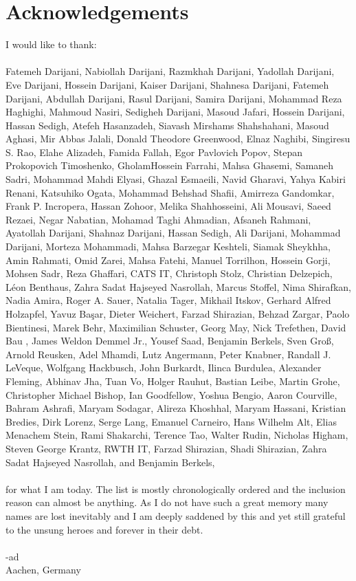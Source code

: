\chapter*{Acknowledgements}


I would like to thank:\\\\
\noindent Fatemeh Darijani, Nabiollah Darijani, Razmkhah Darijani, Yadollah Darijani, Eve Darijani, Hossein Darijani, 
Kaiser Darijani, Shahnesa Darijani, Fatemeh Darijani, Abdullah Darijani, Rasul Darijani, Samira Darijani, 
Mohammad Reza Haghighi, Mahmoud Nasiri, Sedigheh Darijani, Masoud Jafari, Hossein Darijani, Hassan Sedigh, 
Atefeh Hasanzadeh, Siavash Mirshams Shahshahani, Masoud Aghasi, Mir Abbas Jalali, Donald Theodore Greenwood, Elnaz Naghibi, 
Singiresu S. Rao, Elahe Alizadeh, Famida Fallah, Egor Pavlovich Popov, Stepan Prokopovich Timoshenko, GholamHossein Farrahi, 
Mahsa Ghasemi, Samaneh Sadri, Mohammad Mahdi Elyasi, Ghazal Esmaeili, Navid Gharavi, Yahya Kabiri Renani, Katsuhiko Ogata, 
Mohammad Behshad Shafii, Amirreza Gandomkar, Frank P. Incropera, Hassan Zohoor, Melika Shahhosseini, Ali Mousavi, 
Saeed Rezaei, Negar Nabatian, Mohamad Taghi Ahmadian, Afsaneh Rahmani, Ayatollah Darijani, Shahnaz Darijani, 
Hassan Sedigh, Ali Darijani, Mohammad Darijani, Morteza Mohammadi, Mahsa Barzegar Keshteli, Siamak Sheykhha, Amin Rahmati, 
Omid Zarei, Mahsa Fatehi, Manuel Torrilhon, Hossein Gorji, Mohsen Sadr, Reza Ghaffari, CATS IT, Christoph Stolz, 
Christian Delzepich, Léon Benthaus, Zahra Sadat Hajseyed Nasrollah, Marcus Stoffel, Nima Shirafkan, Nadia Amira, 
Roger A. Sauer, Natalia Tager, Mikhail Itskov, Gerhard Alfred Holzapfel, Yavuz Ba\c{s}ar, Dieter Weichert, 
Farzad Shirazian, Behzad Zargar, Paolo Bientinesi, Marek Behr, Maximilian Schuster, Georg May, Nick Trefethen, 
David Bau {\MakeUppercase{}}, James Weldon Demmel Jr., Yousef Saad, Benjamin Berkels, Sven Gro{\ss}, 
Arnold Reusken, Adel Mhamdi, Lutz Angermann, Peter Knabner, Randall J. LeVeque, Wolfgang Hackbusch, John Burkardt, 
Ilinca Burdulea, Alexander Fleming, Abhinav Jha,  Tuan Vo, Holger Rauhut, Bastian Leibe, Martin Grohe, 
Christopher Michael Bishop, Ian Goodfellow, Yoshua Bengio, Aaron Courville, Bahram Ashrafi, Maryam Sodagar, 
Alireza Khoshhal, Maryam Hassani, Kristian Bredies, Dirk Lorenz, Serge Lang, Emanuel Carneiro, Hans Wilhelm Alt, 
Elias Menachem Stein, Rami Shakarchi, Terence Tao, Walter Rudin, Nicholas Higham, Steven George Krantz, RWTH IT, 
Farzad Shirazian, Shadi Shirazian, Zahra Sadat Hajseyed Nasrollah, and Benjamin Berkels,\\\\
for what I am today. The list is mostly chronologically ordered and the inclusion reason can almost be anything. 
As I do not have such a great memory many names are lost inevitably and I am deeply saddened by this and yet still 
grateful to the unsung heroes  and forever in their debt.
\\\\
-ad\\
Aachen, Germany\\

\endinput